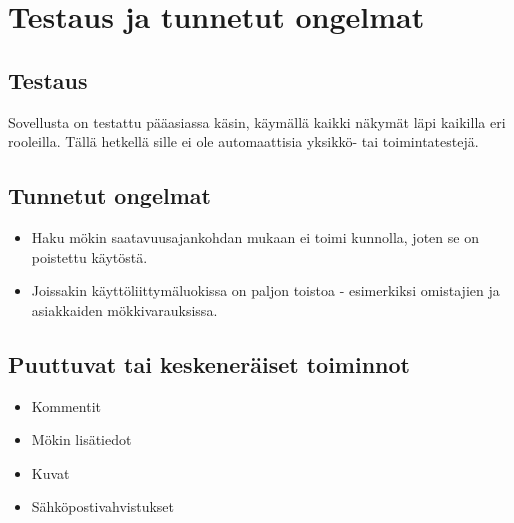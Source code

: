 \chapter{Testaus ja tunnetut ongelmat}

\section{Testaus}

Sovellusta on testattu pääasiassa käsin, käymällä kaikki näkymät läpi kaikilla eri rooleilla. Tällä hetkellä sille ei ole automaattisia yksikkö- tai toimintatestejä.

\section{Tunnetut ongelmat}

\begin{itemize}
	\item Haku mökin saatavuusajankohdan mukaan ei toimi kunnolla, joten se on poistettu käytöstä.
	\item Joissakin käyttöliittymäluokissa on paljon toistoa - esimerkiksi omistajien ja asiakkaiden mökkivarauksissa.
\end{itemize}

\section{Puuttuvat tai keskeneräiset toiminnot}

\begin{itemize}
	\item Kommentit
	\item Mökin lisätiedot
	\item Kuvat
	\item Sähköpostivahvistukset
\end{itemize}
